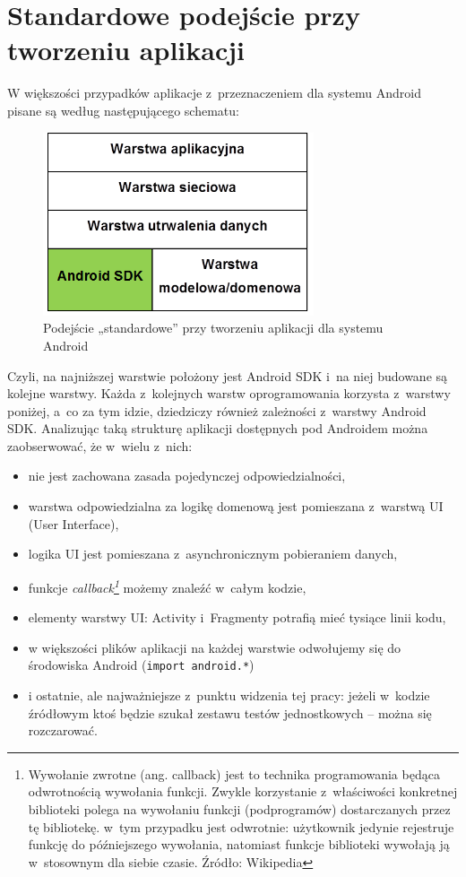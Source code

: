 \section{Standardowe podejście przy tworzeniu aplikacji}
W większości przypadków aplikacje z~przeznaczeniem dla systemu Android pisane są według następującego schematu:

\begin{figure}[!htb]
    \centering
    \includegraphics[width=8cm]{imgs/ch3_opis_problemu_1.png}
    \caption
{Podejście „standardowe” przy tworzeniu aplikacji dla systemu Android}
    \label{fig:opis_problemu}
\end{figure} 

Czyli, na najniższej warstwie położony jest Android SDK i~na niej budowane są kolejne warstwy. Każda z~kolejnych warstw oprogramowania korzysta z~warstwy poniżej, a~co za tym idzie, dziedziczy również zależności z~warstwy Android SDK. Analizując taką strukturę aplikacji dostępnych pod Androidem można zaobserwować, że w~wielu z~nich:
\begin{itemize}
\item
nie jest zachowana zasada pojedynczej odpowiedzialności,
\item
warstwa odpowiedzialna za logikę domenową jest pomieszana z~warstwą UI (User Interface),
\item
logika UI jest pomieszana z~asynchronicznym pobieraniem danych,
\item
funkcje \textit{callback\footnote{Wywołanie zwrotne (ang. callback) jest to technika programowania będąca odwrotnością wywołania funkcji. Zwykle korzystanie z~właściwości konkretnej biblioteki polega na wywołaniu funkcji (podprogramów) dostarczanych przez tę bibliotekę. w~tym przypadku jest odwrotnie: użytkownik jedynie rejestruje funkcję do późniejszego wywołania, natomiast funkcje biblioteki wywołają ją w~stosownym dla siebie czasie. Źródło: Wikipedia}} możemy znaleźć w~całym kodzie,
\item
elementy warstwy UI: Activity i~Fragmenty potrafią mieć tysiące linii kodu,
\item
w większości plików aplikacji na każdej warstwie odwołujemy się do środowiska Android (\texttt{import android.*})
\item
i ostatnie, ale najważniejsze z~punktu widzenia tej pracy: jeżeli w~kodzie źródłowym ktoś będzie szukał zestawu testów jednostkowych – można się rozczarować.
\end{itemize}

